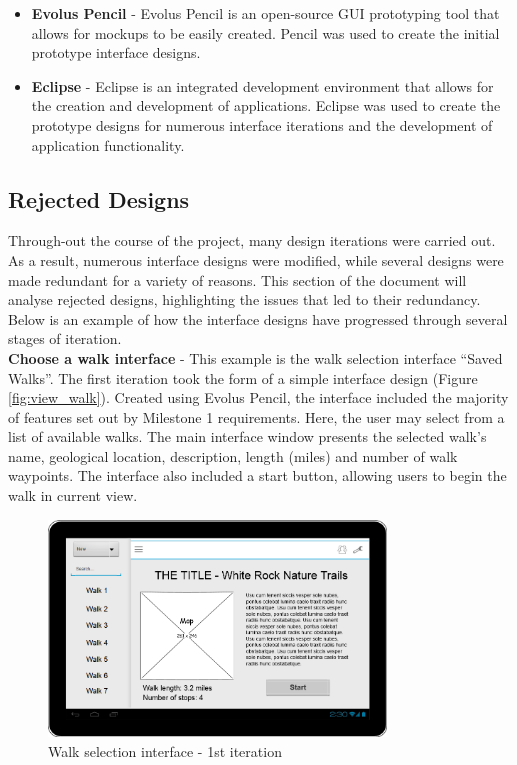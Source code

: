 \documentclass[11pt,a4paper]{report}
\begin{document}
\begin{itemize}

\item \textbf{Evolus Pencil} - Evolus Pencil is an open-source GUI prototyping tool that allows for mockups to be easily created. Pencil was used to create the initial prototype interface designs.

\item \textbf{Eclipse} - Eclipse is an integrated development environment that allows for the creation and development of applications. Eclipse was used to create the prototype designs for numerous interface iterations and the development of application functionality.

\end{itemize}

\subsection{Rejected Designs}
\label{sec:rejected-designs}

Through-out the course of the project, many design iterations were carried out. As a result, numerous interface designs were modified, while several designs were made redundant for a variety of reasons. This section of the document will analyse rejected designs, highlighting the issues that led to their redundancy. Below is an example of how the interface designs have progressed through several stages of iteration.\\

\textbf{Choose a walk interface} - This example is the walk selection interface ``Saved Walks''. The first iteration took the form of a simple interface design (Figure \ref{fig:view_walk}). Created using Evolus Pencil, the interface included the majority of features set out by Milestone 1 requirements. Here, the user may select from a list of available walks. The main interface window presents the selected walk's name, geological location, description, length (miles) and number of walk waypoints. The interface also included a start button, allowing users to begin the walk in current view.

\begin{figure}[H]
    \centering
    \includegraphics[width=0.8\textwidth]{chris/pencil_choose_walk}
    \caption{Walk selection interface - 1st iteration}
    \label{fig:choose_walk1}
\end{figure}
\end{document}
